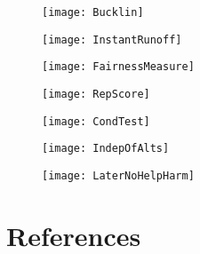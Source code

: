 \documentclass[12pt]{article}
\begin{document}
\begin{centering}
\begin{figure}[H]
\centering
\texttt{[image: Bucklin]}
\end{figure}

\begin{figure}[H]
\centering
\texttt{[image: InstantRunoff]}
\end{figure}

\begin{figure}[H]
\centering
\texttt{[image: FairnessMeasure]}
\end{figure}

\begin{figure}[H]
\centering
\texttt{[image: RepScore]}
\end{figure}

\begin{figure}[H]
\centering
\texttt{[image: CondTest]}
\end{figure}

\begin{figure}[H]
\centering
\texttt{[image: IndepOfAlts]}
\end{figure}

\begin{figure}[H]
\centering
\texttt{[image: LaterNoHelpHarm]}
\end{figure}

\end{centering}
\normalsize

\newpage
\section{References} \label{References}

\printbibliography[title={\tiny{\textcolor{white}{\cite{polcomp}\cite{anes}\cite{cses}\cite{ideahand}}}}]
\end{document}
